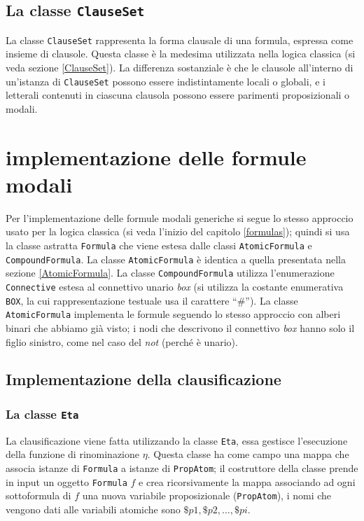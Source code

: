 \documentclass[a4paper,12pt]{report}
\begin{document}
\subsection*{La classe \texttt{ClauseSet}}
La classe \texttt{ClauseSet} rappresenta la forma clausale di una formula, espressa come insieme di clausole. Questa classe è la medesima utilizzata nella logica classica (si veda sezione \ref{ClauseSet}). La differenza sostanziale è che le clausole all'interno di un'istanza di \texttt{ClauseSet} possono essere indistintamente locali o globali, e i letterali contenuti in ciascuna clausola possono essere parimenti proposizionali o modali.


\section{implementazione delle formule modali}
Per l'implementazione delle formule modali generiche si segue lo stesso approccio usato per la logica classica (si veda l'inizio del capitolo \ref{formulas}); quindi si usa la classe astratta \texttt{Formula} che viene estesa dalle classi \texttt{AtomicFormula} e \texttt{CompoundFormula}. La classe \texttt{AtomicFormula} è identica a quella presentata nella sezione \ref{AtomicFormula}. La classe \texttt{CompoundFormula} utilizza l'enumerazione \texttt{Connective} estesa al connettivo unario \emph{box} (si utilizza la costante enumerativa \texttt{BOX}, la cui rappresentazione testuale usa il carattere ``$\#$''). La classe \texttt{AtomicFormula} implementa le formule seguendo lo stesso approccio con alberi binari che abbiamo già visto; i nodi che descrivono il connettivo \emph{box} hanno solo il figlio sinistro, come nel caso del \emph{not} (perché è unario).

\subsection{Implementazione della clausificazione}
\label{clausification_impl}
\subsubsection{La classe \texttt{Eta}}
La clausificazione viene fatta utilizzando la classe \texttt{Eta}, essa gestisce l'esecuzione della funzione di rinominazione $\eta$. Questa classe ha come campo una mappa che associa istanze di \texttt{Formula} a istanze di \texttt{PropAtom}; il costruttore della classe prende in input un oggetto \texttt{Formula} $f$ e crea ricorsivamente la mappa associando ad ogni sottoformula di $f$ una nuova variabile proposizionale (\texttt{PropAtom}), i nomi che vengono dati alle variabili atomiche sono $\$p1, \$p2, \dots, \$pi$.
\end{document}
